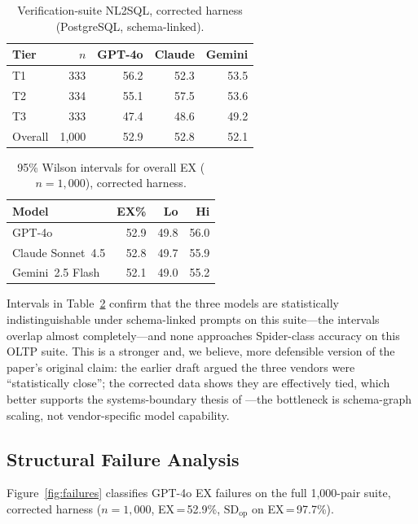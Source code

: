\documentclass[twocolumn]{svjour3}
\begin{document}
\begin{table}[t]
\centering
\caption{Verification-suite NL2SQL, corrected harness (PostgreSQL, schema-linked).}
\label{tab:verification}
\small
\begin{tabular}{@{}lrrrr@{}}
\toprule
\textbf{Tier} & \textbf{$n$} & \textbf{GPT-4o} & \textbf{Claude} & \textbf{Gemini} \\
\midrule
T1 & 333 & 56.2 & 52.3 & 53.5 \\
T2 & 334 & 55.1 & 57.5 & 53.6 \\
T3 & 333 & 47.4 & 48.6 & 49.2 \\
\midrule
Overall & 1{,}000 & 52.9 & 52.8 & 52.1 \\
\bottomrule
\end{tabular}
\end{table}

\begin{table}[t]
\centering
\caption{95\% Wilson intervals for overall EX ($n{=}1{,}000$), corrected harness.}
\label{tab:ci}
\small
\begin{tabular}{@{}lrrr@{}}
\toprule
\textbf{Model} & \textbf{EX\%} & \textbf{Lo} & \textbf{Hi} \\
\midrule
GPT-4o & 52.9 & 49.8 & 56.0 \\
Claude Sonnet~4.5 & 52.8 & 49.7 & 55.9 \\
Gemini~2.5 Flash & 52.1 & 49.0 & 55.2 \\
\bottomrule
\end{tabular}
\end{table}

Intervals in Table~\ref{tab:ci} confirm that the three models are statistically indistinguishable under schema-linked prompts on this suite---the intervals overlap almost completely---and none approaches Spider-class accuracy on this OLTP suite.
This is a stronger and, we believe, more defensible version of the paper's original claim: the earlier draft argued the three vendors were ``statistically close''; the corrected data shows they are effectively tied, which better supports the systems-boundary thesis of ---the bottleneck is schema-graph scaling, not vendor-specific model capability.

\subsection{Structural Failure Analysis}
\label{sec:failures}

Figure~\ref{fig:failures} classifies GPT-4o EX failures on the full 1{,}000-pair suite, corrected harness ($n{=}1{,}000$, EX\,{=\,}52.9\%, $\text{SD}_{\text{op}}$ on EX\,{=\,}97.7\%).
\end{document}
